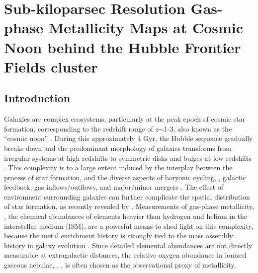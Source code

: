 
\chapter{Sub-kiloparsec Resolution Gas-phase Metallicity Maps at Cosmic Noon behind the Hubble Frontier Fields
cluster \clyi}

\section{Introduction}\label{sect:intro}

Galaxies are complex ecosystems, particularly at the peak epoch of cosmic star formation,
corresponding to the redshift range of $z$$\sim$1-3, also known as the ``cosmic noon''
\citep[see][for a recent review]{2014ARA&A..52..415M}.  During this approximately 4 Gyr, the
Hubble sequence gradually breaks down and the predominant morphology of galaxies transforms
from irregular systems at high redshifts to symmetric disks and bulges at low redshifts
\citep{Mortlock:2013dg}.  This complexity is to a large extent induced by the interplay
between the process of star formation, and the diverse aspects of baryonic cycling, \eg,
galactic feedback, gas inflows/outflows, and major/minor mergers
\citep{2011MNRAS.415...11D,Martin:2012dx}.  The effect of environment surrounding galaxies
can further complicate the spatial distribution of star formation, as recently revealed by
\citet{2015ApJ...814..161V,TheGrismlensampli:-R7Qg0z6}.
Measurements of gas-phase metallicity, \ie, the chemical abundances of elements heavier than
hydrogen and helium in the interstellar medium (ISM), are a powerful means to shed light on
this complexity,
because the metal enrichment history is strongly tied to the mass assembly history in galaxy evolution
\citep{2011MNRAS.416.1354D,Lu:2015ic}.  Since detailed elemental abundances are not directly measurable at extragalactic
distances, the relative oxygen abundance in ionized gaseous nebulae, \ie, \oh, is often chosen as the observational proxy of
metallicity.

